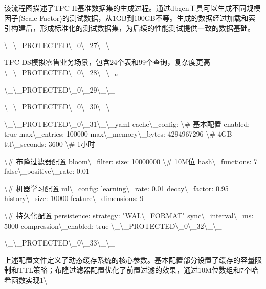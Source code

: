 该流程图描述了TPC-H基准数据集的生成过程。通过dbgen工具可以生成不同规模因子(Scale Factor)的测试数据，从1GB到100GB不等。生成的数据经过加载和索引构建后，形成标准化的测试数据集，为后续的性能测试提供一致的数据基础。

\textbackslash{}_\textbackslash{}_PROTECTED\textbackslash{}_0\textbackslash{}_27\textbackslash{}_\textbackslash{}_

TPC-DS模拟零售业务场景，包含24个表和99个查询，复杂度更高\textbackslash{}_\textbackslash{}_PROTECTED\textbackslash{}_0\textbackslash{}_28\textbackslash{}_\textbackslash{}_。

\textbackslash{}_\textbackslash{}_PROTECTED\textbackslash{}_0\textbackslash{}_29\textbackslash{}_\textbackslash{}_

\textbackslash{}_\textbackslash{}_PROTECTED\textbackslash{}_0\textbackslash{}_30\textbackslash{}_\textbackslash{}_

\textbackslash{}_\textbackslash{}_PROTECTED\textbackslash{}_0\textbackslash{}_31\textbackslash{}_\textbackslash{}_yaml
cache\textbackslash{}_config:
  \textbackslash{}# 基本配置
  enabled: true
  max\textbackslash{}_entries: 100000
  max\textbackslash{}_memory\textbackslash{}_bytes: 4294967296  \textbackslash{}# 4GB
  ttl\textbackslash{}_seconds: 3600             \textbackslash{}# 1小时

  \textbackslash{}# 布隆过滤器配置
  bloom\textbackslash{}_filter:
    size: 10000000              \textbackslash{}# 10M位
    hash\textbackslash{}_functions: 7
    false\textbackslash{}_positive\textbackslash{}_rate: 0.01

  \textbackslash{}# 机器学习配置
  ml\textbackslash{}_config:
    learning\textbackslash{}_rate: 0.01
    decay\textbackslash{}_factor: 0.95
    history\textbackslash{}_size: 10000
    feature\textbackslash{}_dimensions: 9

  \textbackslash{}# 持久化配置
  persistence:
    strategy: "WAL\textbackslash{}_FORMAT"
    sync\textbackslash{}_interval\textbackslash{}_ms: 5000
    compression\textbackslash{}_enabled: true
\textbackslash{}_\textbackslash{}_PROTECTED\textbackslash{}_0\textbackslash{}_32\textbackslash{}_\textbackslash{}_

\textbackslash{}_\textbackslash{}_PROTECTED\textbackslash{}_0\textbackslash{}_33\textbackslash{}_\textbackslash{}_

上述配置文件定义了动态缓存系统的核心参数。基本配置部分设置了缓存的容量限制和TTL策略；布隆过滤器配置优化了前置过滤的效果，通过10M位数组和7个哈希函数实现1\textbackslash{}%


